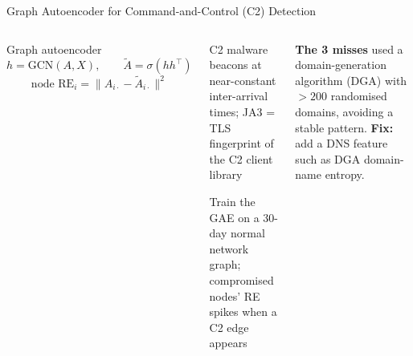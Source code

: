 \documentclass[aspectratio=169,10pt,t]{beamer}
\begin{document}
\begin{frame}{Graph Autoencoder for Command-and-Control (C2) Detection}
\begin{columns}[T]
\begin{fbx}{Graph autoencoder}\[h=\text{GCN}(A,X),\qquad\tilde A=\sigma(hh^{\top})\]\[\text{node RE}_i=\big\|A_{i\cdot}-\tilde A_{i\cdot}\big\|^{2}\]\end{fbx}
\begin{tl}\item C2 malware beacons at near-constant inter-arrival times; JA3 = TLS fingerprint of the C2 client library\item Train the GAE on a 30-day normal network graph; compromised nodes' RE spikes when a C2 edge appears\end{tl}
\begin{wbox}\scriptsize\textbf{The 3 misses} used a domain-generation algorithm (DGA) with $>200$ randomised domains, avoiding a stable pattern. \textbf{Fix:} add a DNS feature such as DGA domain-name entropy.\end{wbox}
\end{columns}
\end{frame}
\end{document}

